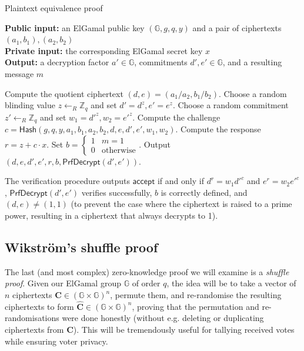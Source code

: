 \documentclass[12pt,a4paper]{article}
\theoremstyle{definition}
\begin{document}
\begin{algorithm}\caption{Plaintext equivalence proof}\label{prot:PEP}
    \textbf{Public input:} an ElGamal public key $(\mathbb{G}, g, q, y)$ and a pair of ciphertexts $(a_1, b_1), (a_2, b_2)$\\
    \textbf{Private input:} the corresponding ElGamal secret key $x$\\
    \textbf{Output:} a decryption factor $a'\in\mathbb{G}$, commitments $d', e'\in\mathbb{G}$, and a resulting message $m$
    \begin{algorithmic}[1]
        \State Compute the quotient ciphertext $(d, e) = (a_1/a_2, b_1/b_2)$.
        \State Choose a random blinding value $z\leftarrow_R\mathbb{Z}_q$ and set $d' = d^z, e' = e^z$.
        \State Choose a random commitment $z'\leftarrow_R\mathbb{Z}_q$ and set $w_1 = d'^z, w_2 = e'^z$.
        \State Compute the challenge $c = \mathsf{Hash}(g, q, y, a_1, b_1, a_2, b_2, d, e, d', e', w_1, w_2)$.
        \State Compute the response $r=z+c\cdot x$.
        \State Set $b=\begin{cases}
                    1 & m = 1           \\
                    0 & \text{otherwise}
                \end{cases}$.
        \State Output $(d, e, d', e', r, b, \mathsf{PrfDecrypt}(d', e'))$.
    \end{algorithmic}
\end{algorithm}

The verification procedure outputs $\mathsf{accept}$ if and only if $d^r=w_1d'^c$ and $e^r=w_2e'^c$, $\mathsf{PrfDecrypt}(d', e')$ verifies successfully, $b$ is correctly defined, and $(d, e)\neq(1, 1)$ (to prevent the case where the ciphertext is raised to a prime power, resulting in a ciphertext that always decrypts to 1).

\subsection{Wikström's shuffle proof}
The last (and most complex) zero-knowledge proof we will examine is a \textit{shuffle proof}. Given our ElGamal group $\mathbb{G}$ of order $q$, the idea will be to take a vector of $n$ ciphertexts $\mathbf{C} \in (\mathbb{G}\times\mathbb{G})^{n}$, permute them, and re-randomise the resulting ciphertexts to form $\mathbf{\hat{C}}\in(\mathbb{G}\times\mathbb{G})^{n}$, proving that the permutation and re-randomisations were done honestly (without e.g. deleting or duplicating ciphertexts from $\mathbf{C}$). This will be tremendously useful for tallying received votes while ensuring voter privacy.
\end{document}
